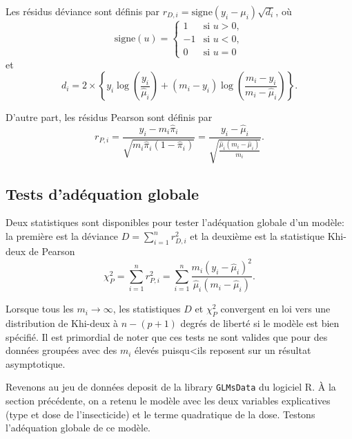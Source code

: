 \documentclass[11pt]{article}
\begin{document}
\noindent Les résidus déviance sont définis par $r_{D,i}= \mbox{signe}(y_i-\mu_i) \sqrt{d_i}$, où 
$$\mbox{signe}(u) = \begin{cases} 1  & \mbox{si } u>0, \\
-1 & \mbox{si } u<0, \\
0 & \mbox{si } u=0 \end{cases}$$
et $$d_i=2 \times \left\{y_i \log\left(\frac{y_i}{\hat\mu_i}\right) + (m_i-y_i) \log\left(\frac{m_i-y_i}{m_i-\hat\mu_i}\right)\right\}.$$

\noindent D'autre part, les résidus Pearson sont définis par $$r_{P,i}=\frac{y_i-m_i\hat\pi_i}{\sqrt{m_i\hat\pi_i(1-\hat\pi_i)}}=\frac{y_i-\hat\mu_i}{\sqrt{\frac{\hat\mu_i(m_i-\hat\mu_i)}{m_i}}}.$$


\subsection{Tests d'adéquation globale}

Deux statistiques sont disponibles pour tester l'adéquation globale d'un modèle: la première est la déviance $D=\sum\limits_{i=1}^n r_{D,i}^2$ et la deuxième est la statistique Khi-deux de Pearson $$\chi^2_P=\sum\limits_{i=1}^n r_{P,i}^2=\sum_{i=1}^n \frac{m_i(y_i-\hat\mu_i)^2}{\hat\mu_i(m_i-\hat\mu_i)}.$$

\noindent Lorsque tous les $m_i \rightarrow \infty$, les statistiques $D$ et $\chi^2_P$ convergent en loi vers une distribution de Khi-deux \`a $n-(p+1)$ degrés de liberté si le modèle est bien spécifié. Il est primordial de noter que ces tests ne sont valides que pour des données groupées avec des $m_i$ élevés puisqu<ils reposent sur un résultat asymptotique.

\noindent Revenons au jeu de données \textsf{deposit} de la library \texttt{GLMsData} du logiciel \textrm{R}. \`A la section précédente, on a retenu le modèle avec les deux variables explicatives (type et dose de l'insecticide) et le terme quadratique de la dose. Testons l'adéquation globale de ce modèle.
\end{document}
